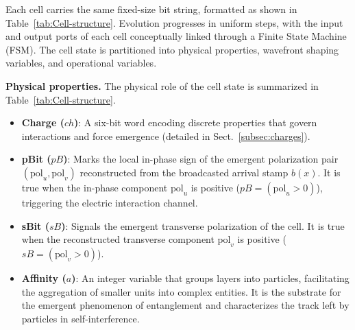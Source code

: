 \documentclass[a4paper]{article}
\begin{document}
Each cell carries the same fixed-size bit string, formatted as shown in Table~\ref{tab:Cell-structure}. Evolution progresses in uniform steps, with the input and output ports of each cell conceptually linked through a Finite State Machine (FSM). The cell state is partitioned into physical properties, wavefront shaping variables, and operational variables.

\medskip\noindent\textbf{Physical properties.} The physical role of the cell state is summarized in Table~\ref{tab:Cell-structure}.
\begin{itemize}
\item \textbf{Charge ($ch$)}: A six-bit word encoding discrete properties that govern interactions and force emergence (detailed in Sect.~\ref{subsec:charges}).
\item \textbf{pBit ($pB$)}: Marks the local in-phase sign of the emergent polarization pair $(\mathrm{pol}_u, \mathrm{pol}_v)$ reconstructed from the broadcasted arrival stamp $b(x)$. It is true when the in-phase component $\mathrm{pol}_u$ is positive ($pB = (\mathrm{pol}_u > 0)$), triggering the electric interaction channel.
\item \textbf{sBit ($sB$)}: Signals the emergent transverse polarization of the cell. It is true when the reconstructed transverse component $\mathrm{pol}_v$ is positive ($sB = (\mathrm{pol}_v > 0)$).
\item \textbf{Affinity ($a$)}: An integer variable that groups layers into particles, facilitating the aggregation of smaller units into complex entities. It is the substrate for the emergent phenomenon of entanglement and characterizes the track left by particles in self-interference.
\end{itemize}
\end{document}
